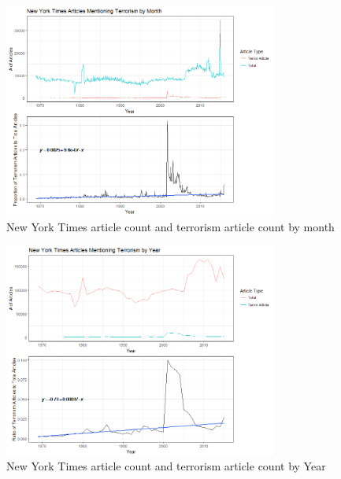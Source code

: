 \documentclass[10pt,a4paper]{article}
\begin{document}
\begin{center}
\begin{figure}[H]
		
	\includegraphics[width=0.8\textwidth]{Plots/NewsData/ArticlesByMonth.png}
	\caption{New York Times article count and terrorism article count by month}

\end{figure}

\begin{figure}[H]
		
	\includegraphics[width=0.8\textwidth]{Plots/NewsData/ArticlesByYear.png}
	\caption{New York Times article count and terrorism article count by Year}

\end{figure}

\begin{figure}[H]


\end{figure}
\end{center}
\end{document}
